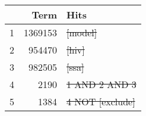 \searchsize
\begin{tabular}{rrl}
	\toprule
	  &          Term & Hits                 \\
	\midrule
	1 & \num{1369153} & \st{[model]}         \\
	2 &  \num{954470} & \st{[hiv]}           \\
	3 &  \num{982505} & \st{[ssa]}           \\
	4 &    \num{2190} & \st{1 AND 2 AND 3}   \\
	5 &    \num{1384} & \st{4 NOT [exclude]} \\
	\bottomrule
\end{tabular}